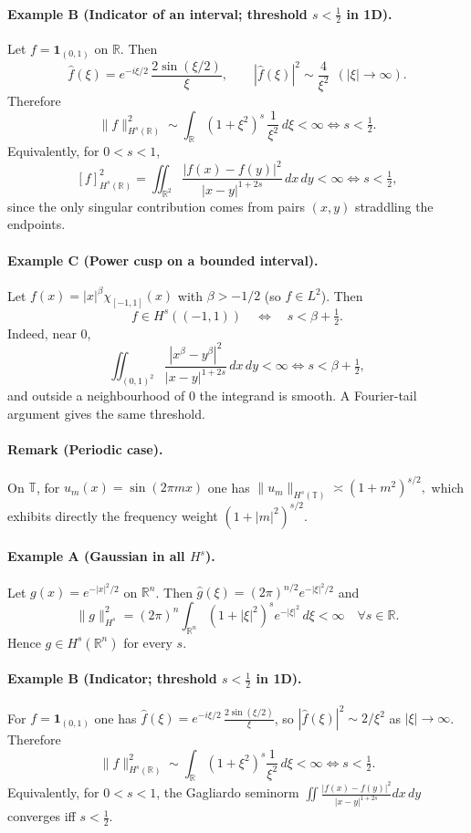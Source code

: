 \documentclass[12pt,a4paper]{article}
\theoremstyle{plain}
\theoremstyle{definition}
\theoremstyle{remark}
\theoremstyle{remark}
\begin{document}
\bigskip

\paragraph{Example B (Indicator of an interval; threshold $s<\tfrac12$ in 1D).}
Let $f=\mathbf 1_{(0,1)}$ on $\mathbb R$. Then
\[
\widehat f(\xi)=e^{-i\xi/2}\,\frac{2\sin(\xi/2)}{\xi},\qquad
|\widehat f(\xi)|^2\sim \frac{4}{\xi^2}\ \ (|\xi|\to\infty).
\]
Therefore
\[
\|f\|_{H^s(\mathbb R)}^2\sim \int_{\mathbb R}(1+\xi^2)^s\,\frac{1}{\xi^2}\,d\xi<\infty
\iff s<\tfrac12.
\]
Equivalently, for $0<s<1$,
\[
[f]_{H^s(\mathbb R)}^2
=\iint_{\mathbb R^2}\frac{|f(x)-f(y)|^2}{|x-y|^{1+2s}}\,dx\,dy<\infty
\iff s<\tfrac12,
\]
since the only singular contribution comes from pairs $(x,y)$ straddling the endpoints.

\bigskip

\paragraph{Example C (Power cusp on a bounded interval).}
Let $f(x)=|x|^\beta \chi_{[-1,1]}(x)$ with $\beta>-1/2$ (so $f\in L^2$). Then
\[
f\in H^s((-1,1)) \quad\Longleftrightarrow\quad s<\beta+\tfrac12.
\]
Indeed, near $0$,
\[
\iint_{(0,1)^2}\frac{|x^\beta-y^\beta|^2}{|x-y|^{1+2s}}\,dx\,dy<\infty
\iff s<\beta+\tfrac12,
\]
and outside a neighbourhood of $0$ the integrand is smooth. A Fourier-tail argument gives the same threshold.

\bigskip

\paragraph{Remark (Periodic case).}
On $\mathbb T$, for $u_m(x)=\sin(2\pi m x)$ one has
\(
\|u_m\|_{H^s(\mathbb T)}\asymp (1+m^2)^{s/2},
\)
which exhibits directly the frequency weight $(1+|m|^2)^{s/2}$.


\paragraph{Example A (Gaussian in all $H^s$).}
Let $g(x)=e^{-|x|^2/2}$ on $\mathbb R^n$. Then
$\widehat g(\xi)=(2\pi)^{n/2}e^{-|\xi|^2/2}$ and
\[
\|g\|_{H^s}^2=(2\pi)^n\!\int_{\mathbb R^n}(1+|\xi|^2)^s e^{-|\xi|^2}\,d\xi<\infty
\quad\forall s\in\mathbb R.
\]
Hence $g\in H^s(\mathbb R^n)$ for every $s$.

\paragraph{Example B (Indicator; threshold $s<\tfrac12$ in 1D).}
For $f=\mathbf 1_{(0,1)}$ one has
\(
\widehat f(\xi)=e^{-i\xi/2}\,\frac{2\sin(\xi/2)}{\xi}
\),
so $|\widehat f(\xi)|^2\sim 2/\xi^2$ as $|\xi|\to\infty$. Therefore
\[
\|f\|_{H^s(\mathbb R)}^2 \sim \int_{\mathbb R} (1+\xi^2)^s \frac{1}{\xi^2}\,d\xi<\infty
\iff s<\tfrac12.
\]
Equivalently, for $0<s<1$, the Gagliardo seminorm
$\iint \frac{|f(x)-f(y)|^2}{|x-y|^{1+2s}}dx\,dy$
converges iff $s<\tfrac12$.
\end{document}
